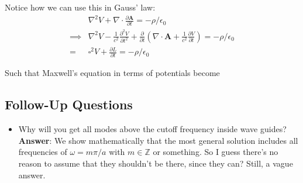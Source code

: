 Notice how we can use this in Gauss' law: \begin{align*}
    &\nabla ^{2} V + \nabla \cdot \frac{\partial \mathbf{A}}{\partial t} = -\rho  /\epsilon_0\\
    \implies &\nabla ^{2} V - \frac{1}{c^{2} }\frac{\partial^{2}  V}{\partial t^{2} }  + \frac{\partial }{\partial t}\left( \nabla \cdot \mathbf{A} + \frac{1}{c^{2} }\frac{\partial V}{\partial t}  \right)   = -\rho  /\epsilon_0\\
    =\ & \boxed{\square^{2}V + \frac{\partial L}{\partial t} = - \rho /\epsilon _0}
\end{align*}

Such that Maxwell's equation in terms of potentials become 



\subsection*{Follow-Up Questions}
\begin{itemize}
    \item Why will you get all modes above the cutoff frequency inside wave guides? \textbf{Answer}: We show mathematically that the most general solution includes all frequencies of \(\omega = m \pi / a\) with \(m \in \mathbb{Z} \) or something. So I guess there's no reason to assume that they shouldn't be there, since they can? Still, a vague answer.
\end{itemize}

